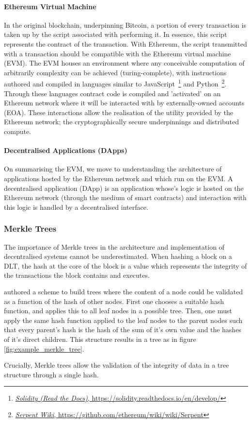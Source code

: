 \paragraph{Ethereum Virtual Machine}

In the original blockchain, underpinning Bitcoin, a portion of every transaction is taken up by the script associated with performing it. In essence, this script represents the contract of the transaction. With Ethereum, the script transmitted with a transaction should be compatible with the Ethereum virtual machine (EVM). The EVM houses an environment where any conceivable computation of arbitrarily complexity can be achieved (turing-complete), with instructions authored and compiled in languages similar to JavaScript~\footnote{\href{https://solidity.readthedocs.io/en/develop/}{\textit{Solidity (Read the Docs)}, https://solidity.readthedocs.io/en/develop/}} and Python~\footnote{\href{https://github.com/ethereum/wiki/wiki/Serpent}{\textit{Serpent Wiki}, https://github.com/ethereum/wiki/wiki/Serpent}}. Through these languages contract code is compiled and 'activated' on an Ethereum network where it will be interacted with by externally-owned accounts (EOA). These interactions allow the realisation of the utility provided by the Ethereum network; the cryptographically secure underpinnings and distributed compute.

\paragraph{Decentralised Applications (DApps)}

On summarising the EVM, we move to understanding the architecture of applications hosted by the Ethereum network and which run on the EVM. A decentralised application (DApp) is an application whose's logic is hosted on the Ethereum network (through the medium of smart contracts) and interaction with this logic is handled by a decentralised interface.

\subsubsection{Merkle Trees}

The importance of Merkle trees in the architecture and implementation of decentralised systems cannot be underestimated. When hashing a block on a DLT, the hash at the core of the block is a value which represents the integrity of the transactions the block contains and executes.

\cite{merkle:1988:inbook} authored a scheme to build trees where the content of a node could be validated as a function of the hash of other nodes. First one chooses a suitable hash function, and applies this to all leaf nodes in a possible tree. Then, one must apply the same hash function applied to the leaf nodes to the parent nodes such that every parent's hash is the hash of the sum of it's own value and the hashes of it's direct children. This structure results in a tree as in figure \ref{fig:example_merkle_tree}.



Crucially, Merkle trees allow the validation of the integrity of data in a tree structure through a single hash.
